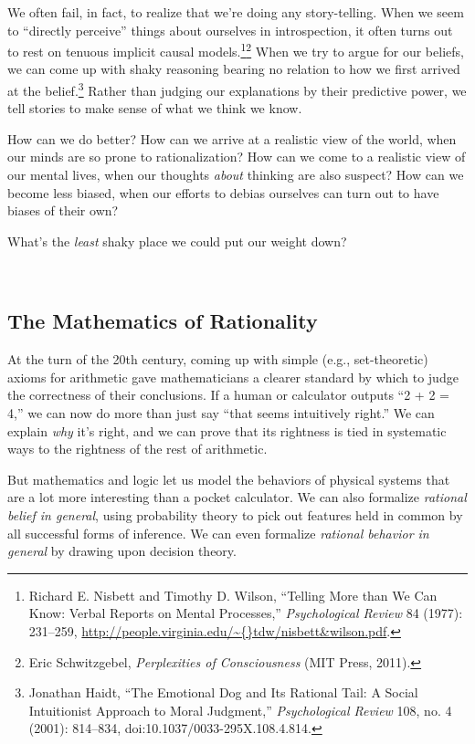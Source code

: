 {
 We often fail, in fact, to realize that we're
doing any story-telling. When we seem to ``directly
perceive'' things about ourselves in introspection,
it often turns out to rest on tenuous implicit causal
models.\footnote{Richard E. Nisbett and Timothy D. Wilson,
``Telling More than We Can Know: Verbal Reports on
Mental Processes,'' \textit{Psychological Review} 84
(1977): 231--259,
\url{http://people.virginia.edu/\~{}tdw/nisbett\&wilson.pdf}.}\supercomma\footnote{Eric Schwitzgebel, \textit{Perplexities of Consciousness} (MIT
Press, 2011).} When we try to argue for our beliefs, we
can come up with shaky reasoning bearing no relation to how we first
arrived at the belief.\footnote{Jonathan Haidt, ``The Emotional Dog and Its
Rational Tail: A Social Intuitionist Approach to Moral
Judgment,'' \textit{Psychological Review} 108, no. 4
(2001): 814--834, doi:10.1037/0033-295X.108.4.814.} Rather than judging our
explanations by their predictive power, we tell stories to make sense
of what we think we know.}

{
 How can we do better? How can we arrive at a realistic view of the
world, when our minds are so prone to rationalization? How can we come
to a realistic view of our mental lives, when our thoughts
\textit{about} thinking are also suspect? How can we become less
biased, when our efforts to debias ourselves can turn out to have
biases of their own?}

{
 What's the \textit{least} shaky place we could put
our weight down?}

{
 ~}

\subsection{The Mathematics of Rationality}

{
 At the turn of the 20th century, coming up with simple (e.g.,
set-theoretic) axioms for arithmetic gave mathematicians a clearer
standard by which to judge the correctness of their conclusions. If a
human or calculator outputs ``2 + 2 =
4,'' we can now do more than just say
``that seems intuitively right.'' We
can explain \textit{why} it's right, and we can prove
that its rightness is tied in systematic ways to the rightness of the
rest of arithmetic.}

{
 But mathematics and logic let us model the behaviors of physical
systems that are a lot more interesting than a pocket calculator. We
can also formalize \textit{rational belief in general}, using
probability theory to pick out features held in common by all
successful forms of inference. We can even formalize \textit{rational
behavior in general} by drawing upon decision theory.}

